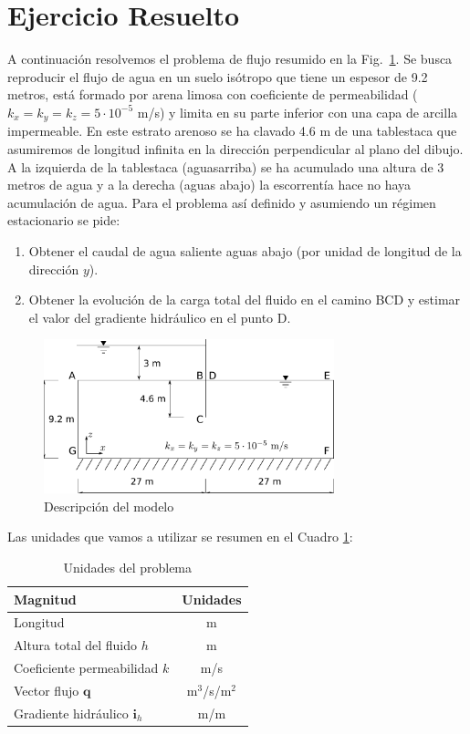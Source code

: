 \section{Ejercicio Resuelto}

A continuación resolvemos el problema de flujo resumido en la
Fig.~\ref{enu01}.  Se busca reproducir el flujo de agua en un suelo
isótropo que tiene un espesor de 9.2 metros, está formado por arena
limosa con coeficiente de permeabilidad ($k_x=k_y=k_z=5\cdot10^{-5}$
m/s) y limita en su parte inferior con una capa de arcilla
impermeable.  En este estrato arenoso se ha clavado 4.6 m de una
tablestaca que asumiremos de longitud infinita en la dirección
perpendicular al plano del dibujo. A la izquierda de la tablestaca
(aguasarriba) se ha acumulado una altura de 3 metros de agua y a la
derecha (aguas abajo) la escorrentía hace no haya acumulación de
agua. Para el problema así definido y asumiendo un régimen
estacionario se pide:
\begin{enumerate}
\item Obtener el caudal de agua saliente aguas abajo (por unidad de
  longitud de la dirección $y$).
\item Obtener la evolución de la carga total del fluido en el camino
  BCD y estimar el valor del gradiente hidráulico en el punto D.
\end{enumerate}

\begin{figure}[!h]
  \begin{center}
    \includegraphics[width=0.75\textwidth]{./body/images/enu01}
  \end{center}
  \caption{Descripción del modelo}
  \label{enu01}
\end{figure}

Las unidades que vamos a utilizar se resumen en el Cuadro \ref{tab:201}:
\begin{table}[!h]
  \centering
  \begin{tabular}{lc}
\hline
Magnitud&Unidades\\
\hline
  Longitud & m\\
  Altura total del fluido $h$ & m \\
  Coeficiente permeabilidad $k$ & m/s\\
  Vector flujo $\mathbf{q}$ & m$^3$/s/m$^2$ \\
  Gradiente hidráulico $\mathbf{i}_h$ & m/m \\
\hline
  \end{tabular}
  \caption{Unidades del problema}
  \label{tab:201}
\end{table}

